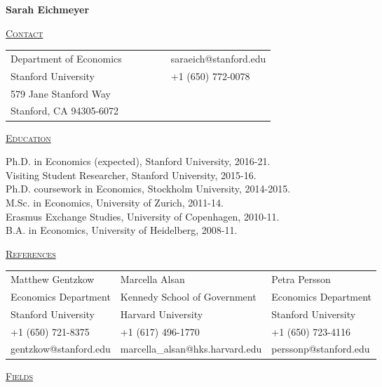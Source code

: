\documentclass[letterpaper,11pt]{article}
\begin{document}
\begin{center}
\Large{\textbf{Sarah Eichmeyer}}
\end{center}



 \bigskip


 \underline {\textsc{Contact}}
 
\begin{tabular}{@{}l@{}cll@{}cl}
Department of Economics &&&&& saraeich@stanford.edu \\
Stanford University &&&&& +1 (650) 772-0078 \\
579 Jane Stanford Way && &&& \\
Stanford, CA 94305-6072 & & 
\end{tabular}

\bigskip
 
\underline {\textsc{Education}}

Ph.D. in Economics (expected), Stanford University, 2016-21. \\
Visiting Student Researcher, Stanford University, 2015-16. \\
Ph.D. coursework in Economics, Stockholm University, 2014-2015. \\
M.Sc. in Economics, University of Zurich, 2011-14. \\
Erasmus Exchange Studies, University of Copenhagen, 2010-11. \\
B.A. in Economics, University of Heidelberg, 2008-11.


\bigskip
 
\underline {\textsc{References}}



\begin{tabularx}{\textwidth}{@{}X@{}X@{}l}
Matthew Gentzkow & Marcella Alsan  & Petra Persson \\
Economics Department  & Kennedy School of Government & Economics Department  \\
Stanford University & Harvard University & Stanford University \\ 
+1 (650) 721-8375 & +1 (617) 496-1770 & +1 (650) 723-4116  \\
gentzkow@stanford.edu & marcella\_alsan@hks.harvard.edu & perssonp@stanford.edu \\
\end{tabularx}

\bigskip
 
\underline {\textsc{Fields}}
\end{document}
